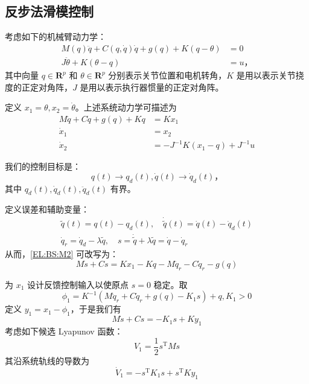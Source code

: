 \subsection{反步法滑模控制}\label{6Fref}

考虑如下的机械臂动力学：
\begin{align*}
    M(q) \ddot{q} + C(q, \dot{q}) \dot{q} + g(q) + K (q - \theta) & = 0 \\
    J \ddot{\theta} + K (\theta - q) & = u \text{，}
\end{align*}
其中向量 $q \in \mathbf{R}^p$ 和 $\theta \in \mathbf{R}^p$ 分别表示关节位置和电机转角，$K$ 是用以表示关节挠度的正定对角阵，$J$ 是用以表示执行器惯量的正定对角阵。

定义 $x_1 = \theta, x_2 = \dot{\theta}$。上述系统动力学可描述为
\begin{align}
    M \ddot{q} + C \dot{q} + g(q) + K q & = K x_1 \label{EL:BS:M2} \\
    \dot{x}_1 & = x_2 \nonumber \\
    \dot{x}_2 & = - J^{- 1} K (x_1 - q) + J^{- 1} u \nonumber
\end{align}

我们的控制目标是：
\[
    q (t) \rightarrow q_d (t), \dot{q} (t) \rightarrow \dot{q}_d (t) \text{，}
\]
其中 $q_d(t), \dot{q}_d(t), \ddot{q}_d(t)$ 有界。

定义误差和辅助变量：
\begin{gather*}
    \tilde{q} (t) = q (t) - q_d (t), \quad \dot{\tilde{q}} (t) = \dot{q} (t) - \dot{q}_d (t) \\
    \dot{q}_r = \dot{q}_d - \lambda \tilde{q}, \quad s = \dot{\tilde{q}} + \lambda \tilde{q} = \dot{q} - \dot{q}_r
\end{gather*}
从而，\eqref{EL:BS:M2} 可改写为：
\[
    M \dot{s} + C  s = K  x_1 - K  q - M \ddot{q}_r - C \dot{q}_r - g(q) 
\]


为  $x_1$ 设计反馈控制输入以使原点 $s=0$ 稳定。取
\[
    \phi_1 = K^{- 1} (M \ddot{q}_r + C \dot{q}_r + g(q) - K_1 s) + q, K_1  > 0
\]
定义 $y_1 = x_1 - \phi_1$，于是我们有
\begin{equation}
    M \dot{s} + C s = - K_1 s + K y_1 \label{EL:BS:M3}
\end{equation}
考虑如下候选 Lyapunov 函数：
\[
    V_1 = \dfrac{1}{2} s^\mathrm{T} M s
\]
其沿系统轨线的导数为
\[
    \dot{V}_1 = - s^\mathrm{T} K_1 s + s^\mathrm{T} K y_1
\]


